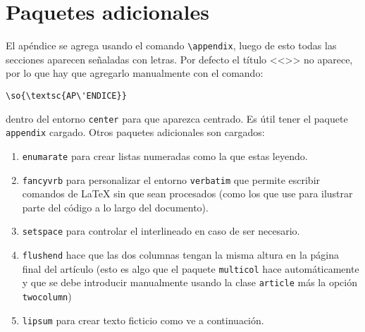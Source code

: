 \documentclass[a4paper,10pt,twocolumn,twoside]{article}
\begin{document}
\section{Paquetes adicionales}
El apéndice se agrega usando el comando \verb+\appendix+, luego de esto todas las secciones aparecen señaladas con letras. Por defecto el título <<>> no aparece, por lo que hay que agregarlo manualmente con el comando:
\begin{Verbatim}[fontsize=\fontsize{7pt}{7pt}\selectfont]
\so{\textsc{AP\'ENDICE}}
\end{Verbatim}
dentro del entorno \texttt{center} para que aparezca centrado. Es útil tener el paquete \texttt{appendix} cargado. Otros paquetes adicionales son cargados:
\begin{enumerate}
    \item \texttt{enumarate} para crear listas numeradas como la que estas leyendo.
    \item \texttt{fancyvrb} para personalizar el entorno \texttt{verbatim} que permite escribir comandos de \LaTeX{} sin que sean procesados (como los que use para ilustrar parte del código a lo largo del documento).
    \item \texttt{setspace} para controlar el interlineado en caso de ser necesario.
    \item \texttt{flushend} hace que las dos columnas tengan la misma altura en la página final del artículo (esto es algo que el paquete \texttt{multicol} hace automáticamente y que se debe introducir manualmente usando la clase \texttt{article} más la opción \texttt{twocolumn})
    \item \texttt{lipsum} para crear texto ficticio como ve a continuación.
\end{enumerate}

\lipsum[1-4]


\end{document}
